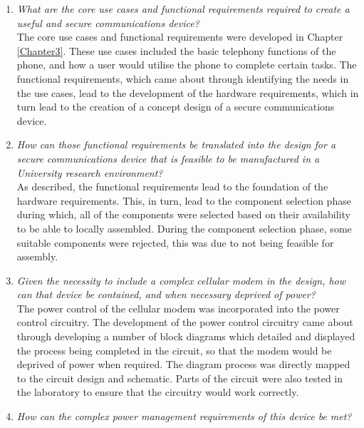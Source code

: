 \begin{enumerate}
\item \textit{What are the core use cases and functional requirements required to create a useful and secure communications device?}\\

	The core use cases and functional requirements were developed in Chapter \ref{Chapter3}. 
These use cases included the basic telephony functions of the phone, and how a user would utilise the phone to complete certain tasks. 
The functional requirements, which came about through identifying the needs in the use cases, lead to the development of the hardware requirements, which in turn lead to the creation of a concept design of a secure communications device.\\

\item \textit{How can those functional requirements be translated into the design for a secure communications device that is feasible to be manufactured in a University research environment?}\\

	As described, the functional requirements lead to the foundation of the hardware requirements. This, in turn, lead to the component selection phase during which, all of the components were selected based on their availability to be able to locally assembled.
During the component selection phase, some suitable components were rejected, this was due to not being feasible for assembly.\\

\item \textit{Given the necessity to include a complex cellular modem in the design, how can that device be contained, and when necessary deprived of power?}\\

	The power control of the cellular modem was incorporated into the power control circuitry. 
The development of the power control circuitry came about through developing a number of block diagrams which detailed and displayed the process being completed in the circuit, so that the modem would be deprived of power when required. 
The diagram process was directly mapped to the circuit design and schematic. Parts of the circuit were also tested in the laboratory to ensure that the circuitry would work correctly. \\

\item \textit{How can the complex power management requirements of this device be met?}\\


\end{enumerate}
